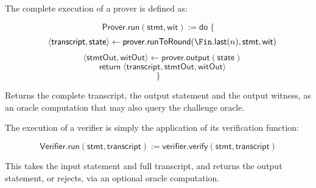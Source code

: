 \begin{definition}
    \label{def:prover_run}
    The complete execution of a prover is defined as:

    \begin{equation*} \mathsf{Prover}.\mathsf{run}(\mathsf{stmt}, \mathsf{wit}) := \mathsf{do} \; \{ \end{equation*}
    \begin{equation*} \quad \langle \mathsf{transcript}, \mathsf{state} \rangle \leftarrow \mathsf{prover}.\mathsf{runToRound}(\Fin.\mathsf{last}(n), \mathsf{stmt}, \mathsf{wit}) \end{equation*}
    \begin{equation*} \quad \langle \mathsf{stmtOut}, \mathsf{witOut} \rangle \leftarrow \mathsf{prover}.\mathsf{output}(\mathsf{state}) \end{equation*}
    \begin{equation*} \quad \mathsf{return} \; \langle \mathsf{transcript}, \mathsf{stmtOut}, \mathsf{witOut} \rangle \end{equation*}
    \begin{equation*} \} \end{equation*}

    Returns the complete transcript, the output statement and the output witness, as an oracle
    computation that may also query the challenge oracle.
    \leanok
\end{definition}

\begin{definition}
    \label{def:verifier_run}
    The execution of a verifier is simply the application of its verification function:

    \begin{equation*} \mathsf{Verifier}.\mathsf{run}(\mathsf{stmt}, \mathsf{transcript}) := \mathsf{verifier}.\mathsf{verify}(\mathsf{stmt}, \mathsf{transcript}) \end{equation*}

    This takes the input statement and full transcript, and returns the output statement, or
    rejects, via an optional oracle computation.
    \leanok
\end{definition}

